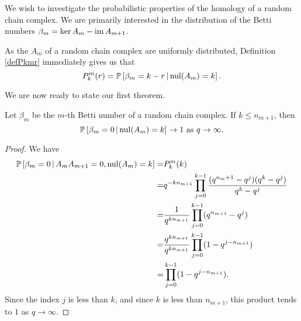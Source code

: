 
We wish to investigate the probabilistic properties of the homology of a random
chain complex.  We are primarily interested in the distribution of the Betti
numbers $\beta_m = \ker A_m - \operatorname{\mathrm{im}} A_{m+1}$.


\begin{remark}
As the $A_m$ of a random chain complex are uniformly distributed, Definition
\ref{defPkmr} immediately gives us that
\[
  P^m_k(r) = \mathbb{P}\left[\beta_m = k-r \,|\, \mathrm{nul}(A_{m}) = k\right].
\]
\end{remark}



We are now ready to state our first theorem.


\begin{lemma}
  \label{lem:condqtoinfty}
Let $\beta_m$ be the $m$-th Betti number of a random chain complex.  If $k\leq n_{m+1}$, then
\[
\mathbb{P}\left[\beta_m= 0 \,|\, \mathrm{nul}(A_{m}) = k \right] \to 1 \textrm{ as } q\to\infty.
\]
\end{lemma}
\begin{proof}
We have
	\begin{align*}
	\mathbb{P}\left[\beta_m = 0 \,|\, A_{m}A_{m+1} = 0, \mathrm{nul}(A_{m}) = k \right]
    =& P^m_k(k)\\
    =& q^{-kn_{m+1}}\prod_{j=0}^{k-1} \frac{(q^{n_m+1}-q^j) (q^k - q^j)}{q^k - q^j}  \\
		=& \frac{1}{q^{kn_{m+1}}} \prod_{j=0}^{k-1}(q^{n_{m+1}} - q^j) \\
		=& \frac{q^{kn_{m+1}}}{q^{kn_{m+1}}}\prod_{j=0}^{k-1}(1-q^{j-n_{m+1}})\\
		=& \prod_{j=0}^{k-1} (1-q^{j-n_{m+1}}).
	\end{align*}
Since the index $j$ is less than $k$, and since $k$ is less than $n_{m+1}$, this product tends to $1$ as $q\to\infty$.  
\end{proof}


